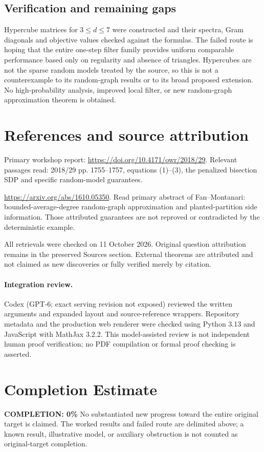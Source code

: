\documentclass[11pt]{article}
\begin{document}
\subsection{Verification and remaining gaps}
Hypercube matrices for $3\le d\le7$ were constructed and their spectra, Gram diagonals and objective values checked against the formulas. The failed route is hoping that the entire one-step filter family provides uniform comparable performance based only on regularity and absence of triangles. Hypercubes are not the sparse random models treated by the source, so this is not a counterexample to its random-graph results or to its broad proposed extension. No high-probability analysis, improved local filter, or new random-graph approximation theorem is obtained.

\section{References and source attribution}
Primary workshop report: \url{https://doi.org/10.4171/owr/2018/29}. Relevant passages read: 2018/29 pp. 1755--1757, equations (1)--(3), the penalized bisection SDP and specific random-model guarantees.

\url{https://arxiv.org/abs/1610.05350}. Read primary abstract of Fan--Montanari: bounded-average-degree random-graph approximation and planted-partition side information. Those attributed guarantees are not reproved or contradicted by the deterministic example.

All retrievals were checked on 11 October 2026. Original question attribution remains in the preserved Sources section. External theorems are attributed and not claimed as new discoveries or fully verified merely by citation.


\paragraph{Integration review.} Codex (GPT-6; exact serving revision not exposed) reviewed the written arguments and expanded layout and source-reference wrappers. Repository metadata and the production web renderer were checked using Python 3.13 and JavaScript with MathJax 3.2.2. This model-assisted review is not independent human proof verification; no PDF compilation or formal proof checking is asserted.

\section{Completion Estimate}
\noindent\textbf{COMPLETION: 0\%}
No substantiated new progress toward the entire original target is claimed. The worked results and failed route are delimited above; a known result, illustrative model, or auxiliary obstruction is not counted as original-target completion.
\end{document}
